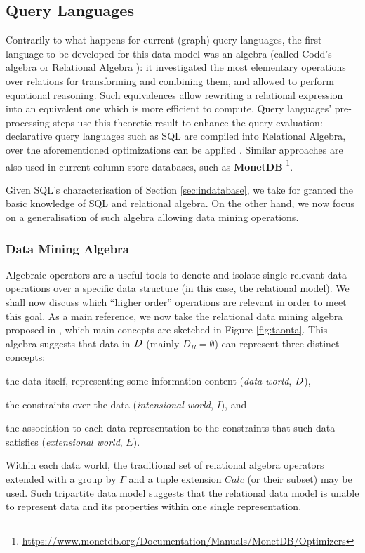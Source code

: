 \subsection{Query Languages}
Contrarily to what happens for current (graph) query languages, the first language to be developed for this data model was an algebra (called Codd's algebra or Relational Algebra \cite{atzeni,atzeniIT,Elmasri}): it investigated the most elementary operations over relations for transforming and combining them, and allowed to perform equational reasoning.  Such equivalences allow rewriting a relational expression into an equivalent one which is more efficient to compute. Query languages' pre-processing steps use this theoretic result to enhance the query evaluation: declarative query languages such as SQL are compiled into Relational Algebra, over the aforementioned optimizations can be applied \cite{ceri1985}. Similar approaches are also used in current column store databases, such as \textbf{MonetDB} \footnote{\url{https://www.monetdb.org/Documentation/Manuals/MonetDB/Optimizers}}.

Given SQL's characterisation of Section \ref{sec:indatabase}, we take for granted the basic knowledge of SQL and relational algebra. On the other hand, we now focus on a generalisation of such algebra allowing data mining operations.

\subsubsection{Data Mining Algebra}\label{subsec:dmalgebra}
Algebraic operators are a useful tools to denote and isolate single relevant data operations over a specific data structure (in this case, the relational model).   We shall now discuss which ``higher order'' operations are relevant in order to meet this goal. As a main reference, we now take the relational data mining algebra proposed in \cite{Calders2006}, which main concepts are sketched in Figure \ref{fig:taonta}. This algebra suggests that data in $\data$ (mainly $D_R=\emptyset$) can represent three distinct concepts: \begin{mylist}
	\item the data itself, representing some information content (\textit{data world}, $\data$),
	\item the constraints over the data (\textit{intensional world}, $I$), and
	\item the association to each data representation to the constraints that such data satisfies (\textit{extensional world}, $E$).
\end{mylist}
Within each data world, the traditional set of relational algebra operators extended with a group by $\Gamma$ and a tuple extension $Calc$ (or their subset) may be used. Such tripartite data model suggests that the relational data model is unable to represent data and its properties within one single representation.


